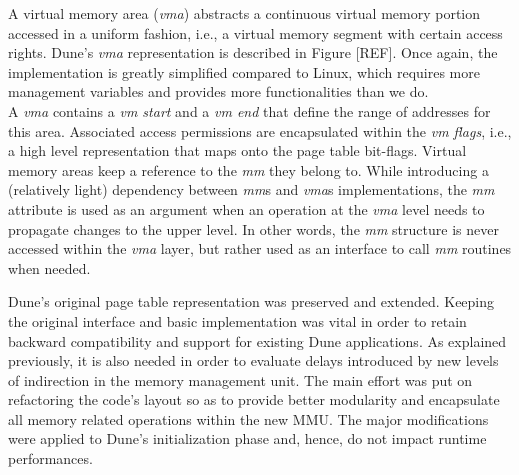 A virtual memory area (\emph{vma}) abstracts a continuous virtual memory portion accessed in a uniform fashion, i.e., a virtual memory segment with certain access rights.
Dune's \emph{vma} representation is described in Figure [REF].
Once again, the implementation is greatly simplified compared to Linux, which requires more management variables and provides more functionalities than we do.\\
A \emph{vma} contains a \emph{vm start} and a \emph{vm end} that define the range of addresses for this area.
Associated access permissions are encapsulated within the \emph{vm flags}, i.e., a high level representation that maps onto the page table bit-flags.
Virtual memory areas keep a reference to the \emph{mm} they belong to.
While introducing a (relatively light) dependency between \emph{mm}s and \emph{vma}s implementations, the \emph{mm} attribute is used as an argument when an operation at the \emph{vma} level needs to propagate changes to the upper level.
In other words, the \emph{mm} structure is never accessed within the \emph{vma} layer, but rather used as an interface to call \emph{mm} routines when needed.

Dune's original page table representation was preserved and extended.
Keeping the original interface and basic implementation was vital in order to retain backward compatibility and support for existing Dune applications.
As explained previously, it is also needed in order to evaluate delays introduced by new levels of indirection in the memory management unit.
The main effort was put on refactoring the code's layout so as to provide better modularity and encapsulate all memory related operations within the new MMU.
The major modifications were applied to Dune's initialization phase and, hence, do not impact runtime performances.

